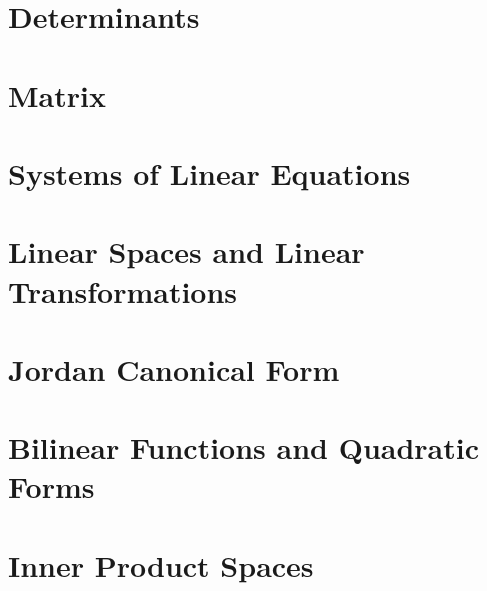 \documentclass{report}
\begin{document}
	
	\thispagestyle{empty}
	\newpage%
	\tableofcontents
  
  \chapter{Determinants}
  
  \chapter{Matrix}
  
  \chapter{Systems of Linear Equations}
  
  \chapter{Linear Spaces and Linear Transformations}
  
  \chapter{Jordan Canonical Form}
  
  \chapter{Bilinear Functions and Quadratic Forms}
  
  \chapter{Inner Product Spaces}
  
  


  


  
\end{document}
